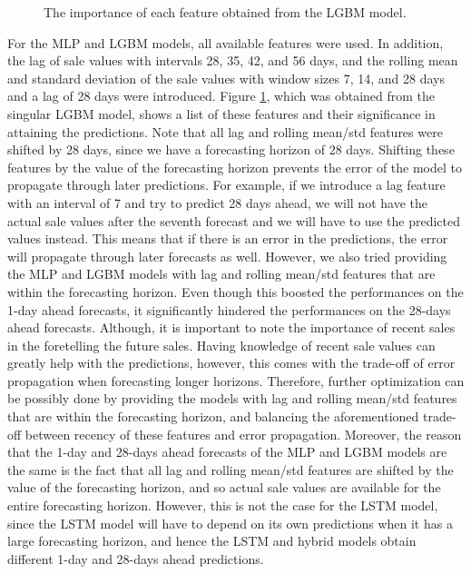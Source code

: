 \begin{figure}[b!]
    \centering
    \caption{The importance of each feature obtained from the LGBM model.}
    \label{fig:feat_imp}
\end{figure}
For the MLP and LGBM models, all available features were used. In addition, the lag of sale values with intervals 28, 35, 42, and 56 days, and the rolling mean and standard deviation of the sale values with window sizes 7, 14, and 28 days and a lag of 28 days were introduced.
Figure \ref{fig:feat_imp}, which was obtained from the singular LGBM model, shows a list of these features and their significance in attaining the predictions.
Note that all lag and rolling mean/std features were shifted by 28 days, since we have a forecasting horizon of 28 days.
Shifting these features by the value of the forecasting horizon prevents the error of the model to propagate through later predictions.
For example, if we introduce a lag feature with an interval of 7 and try to predict 28 days ahead, we will not have the actual sale values after the seventh forecast and we will have to use the predicted values instead. 
This means that if there is an error in the predictions, the error will propagate through later forecasts as well.
However, we also tried providing the MLP and LGBM models with lag and rolling mean/std features that are within the forecasting horizon. 
Even though this boosted the performances on the 1-day ahead forecasts, it significantly hindered the performances on the 28-days ahead forecasts.
Although, it is important to note the importance of recent sales in the foretelling the future sales. 
Having knowledge of recent sale values can greatly help with the predictions, however, this comes with the trade-off of error propagation when forecasting longer horizons.
Therefore, further optimization can be possibly done by providing the models with lag and rolling mean/std features that are within the forecasting horizon, and balancing the aforementioned trade-off between recency of these features and error propagation.
Moreover, the reason that the 1-day and 28-days ahead forecasts of the MLP and LGBM models are the same is the fact that all lag and rolling mean/std features are shifted by the value of the forecasting horizon, and so actual sale values are available for the entire forecasting horizon.
However, this is not the case for the LSTM model, since the LSTM model will have to depend on its own predictions when it has a large forecasting horizon, and hence the LSTM and hybrid models obtain different 1-day and 28-days ahead predictions.